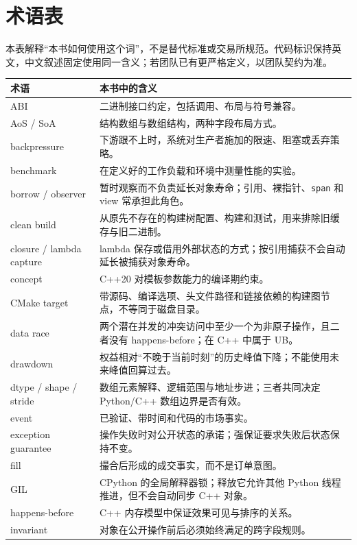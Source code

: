 \chapter{术语表}

本表解释“本书如何使用这个词”，不是替代标准或交易所规范。代码标识保持英文，中文叙述固定使用同一含义；若团队已有更严格定义，以团队契约为准。

\begin{longtable}{p{}p{}}
\toprule
术语 & 本书中的含义 \\
\midrule
ABI & 二进制接口约定，包括调用、布局与符号兼容。\\
AoS / SoA & 结构数组与数组结构，两种字段布局方式。\\
backpressure & 下游跟不上时，系统对生产者施加的限速、阻塞或丢弃策略。\\
benchmark & 在定义好的工作负载和环境中测量性能的实验。\\
borrow / observer & 暂时观察而不负责延长对象寿命；引用、裸指针、\texttt{span} 和 view 常承担此角色。\\
clean build & 从原先不存在的构建树配置、构建和测试，用来排除旧缓存与旧二进制。\\
closure / lambda capture & lambda 保存或借用外部状态的方式；按引用捕获不会自动延长被捕获对象寿命。\\
concept & C++20 对模板参数能力的编译期约束。\\
CMake target & 带源码、编译选项、头文件路径和链接依赖的构建图节点，不等同于磁盘目录。\\
data race & 两个潜在并发的冲突访问中至少一个为非原子操作，且二者没有 happens-before；在 C++ 中属于 UB。\\
drawdown & 权益相对“不晚于当前时刻”的历史峰值下降；不能使用未来峰值回算过去。\\
dtype / shape / stride & 数组元素解释、逻辑范围与地址步进；三者共同决定 Python/C++ 数组边界是否有效。\\
event & 已验证、带时间和代码的市场事实。\\
exception guarantee & 操作失败时对公开状态的承诺；强保证要求失败后状态保持不变。\\
fill & 撮合后形成的成交事实，而不是订单意图。\\
GIL & CPython 的全局解释器锁；释放它允许其他 Python 线程推进，但不会自动同步 C++ 对象。\\
happens-before & C++ 内存模型中保证效果可见与排序的关系。\\
invariant & 对象在公开操作前后必须始终满足的跨字段规则。\\

\end{longtable}
